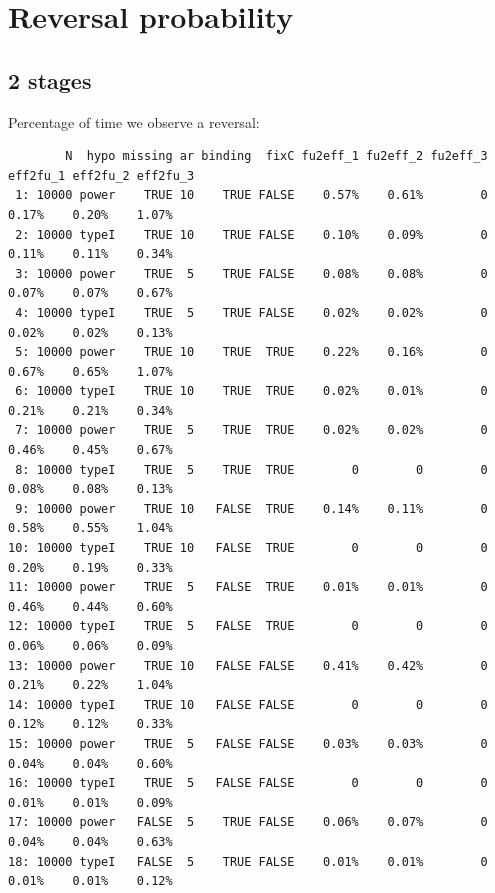 \documentclass[12pt]{article}
\begin{document}
\clearpage

\section{Reversal probability}
\label{sec:org02cf1f9}

\subsection{2 stages}
\label{sec:org8549a3a}

Percentage of time we observe a reversal:

\begin{verbatim}
        N  hypo missing ar binding  fixC fu2eff_1 fu2eff_2 fu2eff_3 eff2fu_1 eff2fu_2 eff2fu_3
 1: 10000 power    TRUE 10    TRUE FALSE    0.57%    0.61%        0    0.17%    0.20%    1.07%
 2: 10000 typeI    TRUE 10    TRUE FALSE    0.10%    0.09%        0    0.11%    0.11%    0.34%
 3: 10000 power    TRUE  5    TRUE FALSE    0.08%    0.08%        0    0.07%    0.07%    0.67%
 4: 10000 typeI    TRUE  5    TRUE FALSE    0.02%    0.02%        0    0.02%    0.02%    0.13%
 5: 10000 power    TRUE 10    TRUE  TRUE    0.22%    0.16%        0    0.67%    0.65%    1.07%
 6: 10000 typeI    TRUE 10    TRUE  TRUE    0.02%    0.01%        0    0.21%    0.21%    0.34%
 7: 10000 power    TRUE  5    TRUE  TRUE    0.02%    0.02%        0    0.46%    0.45%    0.67%
 8: 10000 typeI    TRUE  5    TRUE  TRUE        0        0        0    0.08%    0.08%    0.13%
 9: 10000 power    TRUE 10   FALSE  TRUE    0.14%    0.11%        0    0.58%    0.55%    1.04%
10: 10000 typeI    TRUE 10   FALSE  TRUE        0        0        0    0.20%    0.19%    0.33%
11: 10000 power    TRUE  5   FALSE  TRUE    0.01%    0.01%        0    0.46%    0.44%    0.60%
12: 10000 typeI    TRUE  5   FALSE  TRUE        0        0        0    0.06%    0.06%    0.09%
13: 10000 power    TRUE 10   FALSE FALSE    0.41%    0.42%        0    0.21%    0.22%    1.04%
14: 10000 typeI    TRUE 10   FALSE FALSE        0        0        0    0.12%    0.12%    0.33%
15: 10000 power    TRUE  5   FALSE FALSE    0.03%    0.03%        0    0.04%    0.04%    0.60%
16: 10000 typeI    TRUE  5   FALSE FALSE        0        0        0    0.01%    0.01%    0.09%
17: 10000 power   FALSE  5    TRUE FALSE    0.06%    0.07%        0    0.04%    0.04%    0.63%
18: 10000 typeI   FALSE  5    TRUE FALSE    0.01%    0.01%        0    0.01%    0.01%    0.12%
\end{verbatim}

\clearpage
\end{document}
